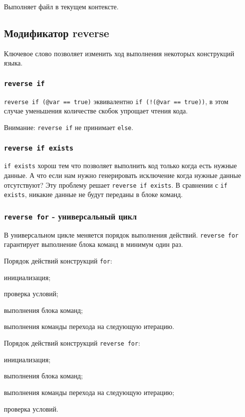 Выполняет файл в текущем контексте.

\subsection{Модификатор {\color{blue2} reverse}}

Ключевое слово  позволяет изменить ход выполнения некоторых конструкций языка.

\subsubsection{\lstinline|reverse if|}

\lstinline|reverse if (@var == true)| эквивалентно \lstinline|if (!(@var == true))|, в этом случае уменьшения количестве скобок упрощает чтения кода. 

Внимание: \lstinline|reverse if| не принимает \lstinline|else|.

\subsubsection{\lstinline|reverse if exists|}

\lstinline|if exists| хорош тем что позволяет выполнить код только когда есть нужные данные. А что если нам нужно генерировать исключение когда нужные данные отсутствуют? Эту проблему решает \lstinline|reverse if exists|. В сравнении с \lstinline|if exists|, никакие данные не будут переданы в блоке команд.

\subsubsection{\lstinline|reverse for| - универсальный цикл}

В универсальном цикле меняется порядок выполнения действий. \lstinline|reverse for| гарантирует выполнение блока команд в минимум один раз.

Порядок действий конструкций \lstinline|for|:
\begin{icEnum}
	\item инициализация;
	\item проверка условий;
	\item выполнения блока команд;
	\item выполнения команды перехода на следующую итерацию.
\end{icEnum}

Порядок действий конструкций \lstinline|reverse for|:
\begin{icEnum}
	\item инициализация;
	\item выполнения блока команд;
	\item выполнения команды перехода на следующую итерацию;
	\item проверка условий.
\end{icEnum}

